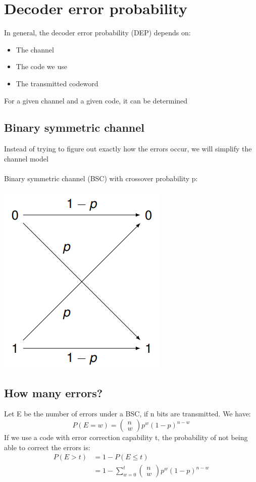 \documentclass{article}[18pt]
\begin{document}
\section{Decoder error probability}
In general, the decoder error probability (DEP) depends on:
\begin{itemize}
	\item The channel
	\item The code we use
	\item The transmitted codeword
\end{itemize}
For a given channel and a given code, it can be determined
\subsection{Binary symmetric channel}
Instead of trying to figure out exactly how the errors occur, we will simplify the channel model\\
\\
Binary symmetric channel (BSC) with crossover probability p:
\begin{center}
	\includegraphics[scale=0.7]{bsc1}
\end{center}
\subsection{How many errors?}
Let E be the number of errors under a BSC, if n bits are transmitted. We have:
$$P ( E = w ) = \left( \begin{array} { c } { n } \\ { w } \end{array} \right) p ^ { w } ( 1 - p ) ^ { n - w }$$
If we use a code with error correction capability t, the probability of not being able to correct the errors is:
$$\begin{aligned} P ( E > t ) & = 1 - P ( E \leq t ) \\ & = 1 - \sum _ { w = 0 } ^ { t } \left( \begin{array} { l } { n } \\ { w } \end{array} \right) p ^ { w } ( 1 - p ) ^ { n - w } \end{aligned}$$
\end{document}

